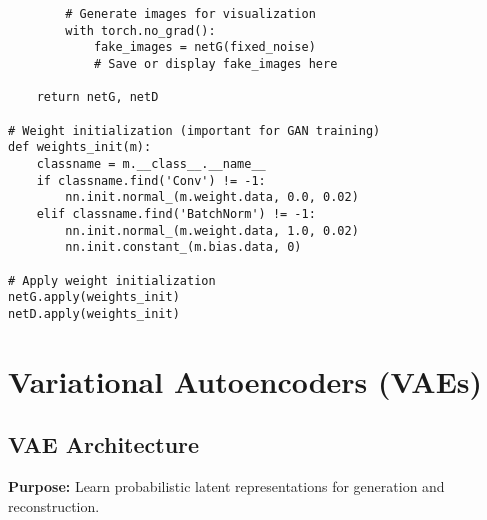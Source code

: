 \documentclass[11pt,a4paper]{book}
\begin{document}
\begin{verbatim}
        # Generate images for visualization
        with torch.no_grad():
            fake_images = netG(fixed_noise)
            # Save or display fake_images here
    
    return netG, netD

# Weight initialization (important for GAN training)
def weights_init(m):
    classname = m.__class__.__name__
    if classname.find('Conv') != -1:
        nn.init.normal_(m.weight.data, 0.0, 0.02)
    elif classname.find('BatchNorm') != -1:
        nn.init.normal_(m.weight.data, 1.0, 0.02)
        nn.init.constant_(m.bias.data, 0)

# Apply weight initialization
netG.apply(weights_init)
netD.apply(weights_init)
\end{verbatim}

\section{Variational Autoencoders (VAEs)}

\subsection{VAE Architecture}

\textbf{Purpose:} Learn probabilistic latent representations for generation and reconstruction.
\end{document}
